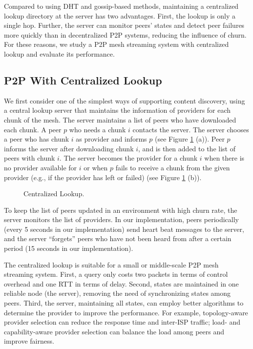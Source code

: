     Compared to using DHT and gossip-based methods, maintaining 
    a centralized lookup directory at the server has two 
    advantages.  First, the lookup is only a single hop.  Further,
    the server can monitor peers' states and detect peer 
    failures more quickly than in decentralized P2P systems, 
    reducing the influence of churn.
    For these reasons, we study a P2P
    mesh streaming system with centralized lookup and evaluate its performance.

\subsection{P2P With Centralized Lookup}
\label{s:cp2p}

    We first consider one of the simplest ways of supporting content discovery,
    using a central lookup server that maintains the information of providers 
    for each chunk of the mesh. 
    The server maintains a list of peers who have downloaded each chunk.
    A peer $p$ who needs a chunk $i$ contacts the server.  The server
    chooses a peer who has chunk $i$ as provider and informs $p$ (see
    Figure \ref{f:cp2p} (a)).  Peer $p$
    informs the server after downloading chunk $i$, and is then added to the
    list of peers with chunk $i$.
    The server becomes the provider for a chunk $i$ when there is no 
    provider available for $i$ or when $p$ fails to receive a chunk from the
    given provider (e.g., if the provider has left or failed)
    (see Figure \ref{f:cp2p} (b)).

   \begin{figure}[t]
    \centering
    \caption{Centralized Lookup. 
    \label{f:cp2p}}
    \end{figure}

    To keep the list of peers updated in an environment with high
    churn rate,  the server monitors
    the list of providers. %
    In our implementation, peers periodically (every 5 seconds in our
    implementation) send
    heart beat messages to the server, and the server 
    ``forgets'' peers who have not been heard from after a certain
    period (15 seconds in our implementation).

    The centralized lookup is suitable for a small or middle-scale 
    P2P mesh streaming system.
    First, a query only costs two packets in terms of control overhead and 
    one RTT in terms of delay.
    Second, 
    states are maintained in one reliable
    node (the server), removing the need of synchronizing states among
    peers. 
    Third, the server, maintaining all states, can employ better %
    algorithms to determine the provider to improve the performance. 
    For example, topology-aware provider selection can 
    reduce the response time and inter-ISP traffic; load- and capability-aware 
	provider selection can balance the load among peers and improve fairness.
    
